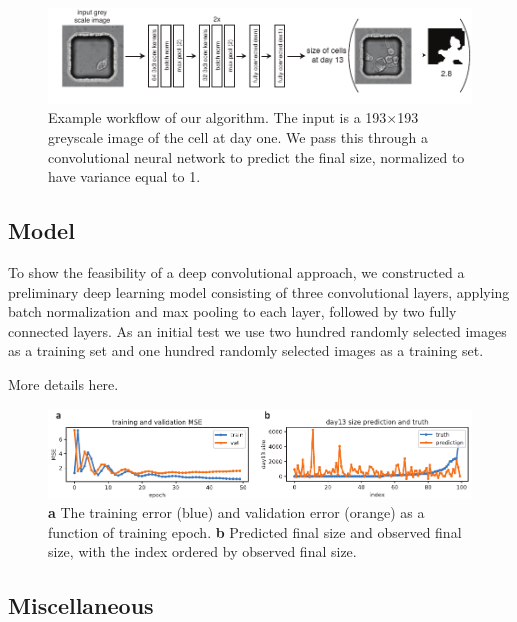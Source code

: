 \documentclass[10pt,twocolumn,letterpaper]{article}
\begin{document}
\begin{figure}[t!]
\begin{center}
 \includegraphics[width=0.8\linewidth]{figures/networkExampleImage.pdf}
\end{center}
   \caption{Example workflow of our algorithm.  The input is a 193$\times$193 greyscale image of the cell at day one.  We pass this through a convolutional neural network to predict the final size, normalized to have variance equal to 1.}
\label{workflow}
\end{figure}

\subsection*{Model}

To show the feasibility of a deep convolutional approach, we constructed a preliminary deep learning model consisting of three convolutional layers, applying batch normalization and max pooling to each layer, followed by two fully connected layers.  As an initial test we use two hundred randomly selected images as a training set and one hundred randomly selected images as a training set.  

More details here.




\begin{figure}[t!]
\begin{center}
 \includegraphics[width=0.8\linewidth]{figures/error_vs_epoch_and_validation_predictions_vs_observed.pdf}
\end{center}
   \caption{\textbf{a} The training error (blue) and validation error (orange) as a function of training epoch.  \textbf{b} Predicted final size and observed final size, with the index ordered by observed final size. }
\label{workflow}
\end{figure}



\subsection{Miscellaneous}



{\small


}
\end{document}
